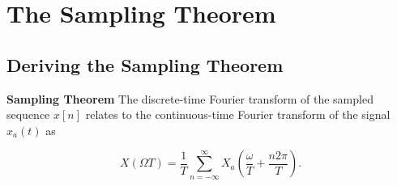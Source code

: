 \chapter{The Sampling Theorem}

\section{Deriving the Sampling Theorem }



\begin{thm}{\textbf{Sampling Theorem}}
The discrete-time Fourier transform of the sampled sequence $x[n]$ relates to the continuous-time Fourier transform of the signal $x_a(t)$ as

\begin{equation}
X\left( {\Omega T} \right) = \frac{1}{T}\sum\limits_{n =  - \infty }^\infty  {{X_a}\left( {\frac{\omega }{T} + \frac{{n2\pi }}{T}} \right)}.
\end{equation}
\end{thm}

